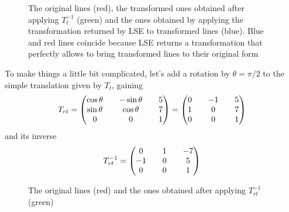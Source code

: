 \documentclass[a4paper, onecolumn]{report}
\begin{document}
\begin{figure}[htbp]
\centering
{}
\caption{The original lines (red), the transformed ones obtained after applying $T_t^{-1}$ (green) and the ones obtained by applying the transformation returned by LSE to transformed lines (blue). Blue and red lines coincide because LSE returns a transformation that perfectly allows to bring transformed lines to their original form}
\end{figure}

To make things a little bit complicated, let's add a rotation by $\theta = \pi/2$ to the simple translation given by $T_t$, gaining
\begin{equation}
	T_{rt} = \left(\begin{matrix}\cos\theta && -\sin\theta && 5 \\ \sin\theta && \cos\theta && 7 \\ 0 && 0 && 1\end{matrix} \right) = \left(\begin{matrix}0 && -1 && 5 \\ 1 && 0 && 7 \\ 0 && 0 && 1\end{matrix} \right) \notag
\end{equation}
and its inverse
\begin{equation}
	T_{rt}^{-1} = \left(\begin{matrix}0 && 1 && -7 \\ -1 && 0 && 5 \\ 0 && 0 && 1\end{matrix} \right) \notag
\end{equation}

\begin{figure}[htbp]
\centering
{}
\caption{The original lines (red) and the ones obtained after applying $T_{rt}^{-1}$ (green)}
\end{figure}
\end{document}
